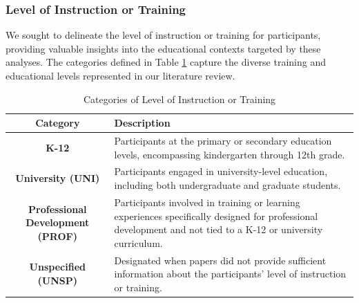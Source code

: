 \documentclass[manuscript,screen,review]{acmart}
\begin{document}
\subsubsection{Level of Instruction or Training} \label{subsec:level_of_instruction}
We sought to delineate the level of instruction or training for participants, providing valuable insights into the educational contexts targeted by these analyses. The categories defined in Table \ref{tab:level-instruction-training} capture the diverse training and educational levels represented in our literature review.


\begin{table}[ht]
    \caption{Categories of Level of Instruction or Training}
    \label{tab:level-instruction-training}
    \centering
    \begin{tabular}{|c|p{}|}
        \hline
        \textbf{Category} & \textbf{Description} \\
        \hline
        \textbf{K-12} & Participants at the primary or secondary education levels, encompassing kindergarten through 12th grade. \\
        \hline
        \textbf{University (UNI)} & Participants engaged in university-level education, including both undergraduate and graduate students. \\
        \hline
        \textbf{Professional Development (PROF)} & Participants involved in training or learning experiences specifically designed for professional development and not tied to a K-12 or university curriculum. \\
        \hline
        \textbf{Unspecified (UNSP)} & Designated when papers did not provide sufficient information about the participants' level of instruction or training. \\
        \hline
    \end{tabular}
\end{table}
\end{document}
